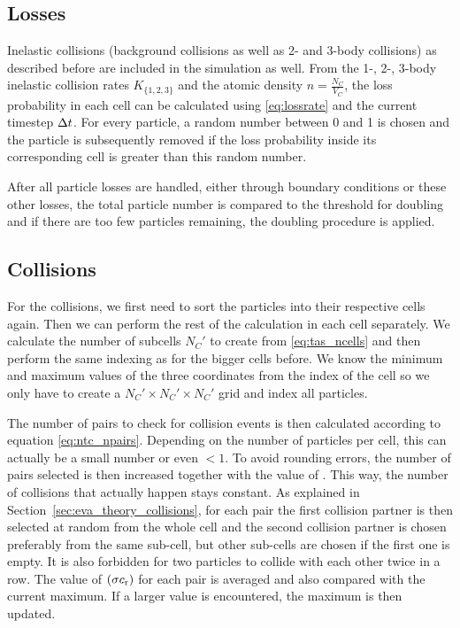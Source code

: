 \subsection{Losses}
Inelastic collisions (background collisions as well as 2- and 3-body collisions) as described before are included in the simulation as well. From the 1-, 2-, 3-body inelastic collision rates $K_{\{1,2,3\}}$ and the atomic density $n = \frac{N_C}{V_C}$, the loss probability in each cell can be calculated using \eqref{eq:lossrate} and the current timestep $\Delta t$.
For every particle, a random number between 0 and 1 is chosen and the particle is subsequently removed if the loss probability inside its corresponding cell is greater than this random number.

After all particle losses are handled, either through boundary conditions or these other losses, the total particle number is compared to the threshold for doubling and if there are too few particles remaining, the doubling procedure is applied.

\subsection{Collisions}
For the collisions, we first need to sort the particles into their respective cells again. Then we can perform the rest of the calculation in each cell separately.
We calculate the number of subcells $N_{C}'$ to create from \eqref{eq:tas_ncells} and then perform the same indexing as for the bigger cells before. We know the minimum and maximum values of the three coordinates from the index of the cell so we only have to create a $N_{C}' \times N_{C}' \times N_{C}'$ grid and index all particles.

The number of pairs to check for collision events is then calculated according to equation \eqref{eq:ntc_npairs}. Depending on the number of particles per cell, this can actually be a small number or even $< 1$. To avoid rounding errors, the number of pairs selected is then increased together with the value of \maxProb. This way, the number of collisions that actually happen stays constant. As explained in Section~\ref{sec:eva_theory_collisions}, for each pair the first collision partner is then selected at random from the whole cell and the second collision partner is chosen preferably from the same sub-cell, but other sub-cells are chosen if the first one is empty. It is also forbidden for two particles to collide with each other twice in a row. The value of $(\sigma c_\text{r})$ for each pair is averaged and also compared with the current maximum. If a larger value is encountered, the maximum is then updated.

